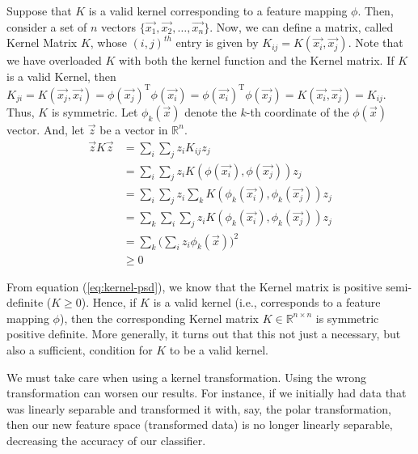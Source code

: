 Suppose that $K$ is a valid kernel corresponding to a feature mapping $\phi$. Then, consider a set of $n$ vectors $\{\vec{x_1}, \vec{x_2}, \dots, \vec{x_n}\}$. Now, we can define a matrix, called Kernel Matrix $K$, whose $(i,j)^{th}$ entry is given by $K_{ij} = K(\vec{x_i}, \vec{x_j})$. Note that we have overloaded $K$ with both the kernel function and the Kernel matrix.
If $K$ is a valid Kernel, then $K_{ji} = K(\vec{x_j}, \vec{x_i}) = \phi(\vec{x_j})^{\text{T}}\phi(\vec{x_i}) = \phi(\vec{x_i})^{\text{T}}\phi(\vec{x_j}) = K(\vec{x_i}, \vec{x_j}) = K_{ij}$. Thus, $K$ is symmetric. Let $\phi_k(\vec{x})$ denote the $k$-th coordinate of the $\phi(\vec{x})$ vector. And, let $\vec{z}$ be a vector in $\mathbb{R}^n$.
\begin{align}
	\vec{z}K\vec{z} &= \sum_{i}\sum_{j} z_{i}K_{ij}z_{j} \nonumber \\
&= \sum_{i}\sum_{j} z_{i}K(\phi(\vec{x_i}), \phi(\vec{x_j}))z_{j} \nonumber \\
&= \sum_{i}\sum_{j} z_{i}\sum_{k} K(\phi_k(\vec{x_i}), \phi_k(\vec{x_j}))z_{j} \nonumber \\
&= \sum_{k}\sum_{i}\sum_{j} z_{i}K(\phi_k(\vec{x_i}), \phi_k(\vec{x_j}))z_{j} \nonumber \\
&= \sum_{k} \Bigg(\sum_{i} z_i\phi_{k}(\vec{x})\Bigg)^2 \nonumber \\
&\geq 0 \label{eq:kernel-psd}
\end{align}

From equation (\ref{eq:kernel-psd}), we know that the Kernel matrix is positive semi-definite ($K \geq 0$). Hence, if $K$ is a valid kernel (i.e., corresponds to a feature mapping $\phi$), then the corresponding Kernel matrix $K \in \mathbb{R}^{n\times n}$ is symmetric positive definite. More generally, it turns out that this not just a necessary, but also a sufficient, condition for $K$ to be a valid kernel.

We must take care when using a kernel transformation. Using the wrong transformation can worsen our results. For instance, if we initially had data that was linearly separable and transformed it with, say, the polar transformation, then our new feature space (transformed data) is no longer linearly separable, decreasing the accuracy of our classifier.